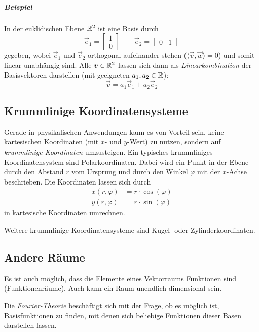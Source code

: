 			\subparagraph{Beispiel}
				In der euklidischen Ebene \( \mathbb{R}^2 \) ist eine Basis durch
				\begin{equation*}
					\vec{e}_1 = \begin{bmatrix} 1 \\ 0 \end{bmatrix} \quad\quad \vec{e}_2 = \begin{bmatrix} 0 & 1 \end{bmatrix}
				\end{equation*}
				gegeben, wobei \(\vec{e}_1\) und \(\vec{e}_2\) orthogonal aufeinander stehen (\( \langle \vec{v}, \vec{w} \rangle = 0 \)) und somit linear unabhängig sind. Alle \( \bm{v} \in \mathbb{R}^2 \) lassen sich dann als \emph{Linearkombination} der Basisvektoren darstellen (mit geeigneten \( a_1, a_2 \in \mathbb{R} \)):
				\begin{equation*}
					\vec{v} = a_1 \vec{e}_1 + a_2 \vec{e}_2
				\end{equation*}

		\subsection{Krummlinige Koordinatensysteme}
			Gerade in physikalischen Anwendungen kann es von Vorteil sein, keine kartesischen Koordinaten (mit \(x\)- und \(y\)-Wert) zu nutzen, sondern auf \emph{krummlinige Koordinaten} umzusteigen. Ein typisches krummliniges Koordinatensystem sind \zB Polarkoordinaten. Dabei wird ein Punkt in der Ebene durch den Abstand \(r\) vom Ursprung und durch den Winkel \(\varphi\) mit der \(x\)-Achse beschrieben. Die Koordinaten lassen sich durch
			\begin{align*}
				x(r, \varphi) &= r \cdot \cos(\varphi) \\
				y(r, \varphi) &= r \cdot \sin(\varphi)
			\end{align*}
			in kartesische Koordinaten umrechnen.
			
			Weitere krummlinige Koordinatensysteme sind \zB Kugel- oder Zylinderkoordinaten.

		\subsection{Andere Räume}
			Es ist auch möglich, dass die Elemente eines Vektorraums Funktionen sind (Funktionenräume). Auch kann ein Raum unendlich-dimensional sein.
			
			Die \emph{Fourier-Theorie} beschäftigt sich mit der Frage, ob es möglich ist, Basisfunktionen zu finden, mit denen sich beliebige Funktionen \bzgl dieser Basen darstellen lassen.

